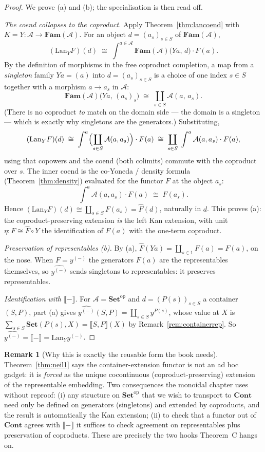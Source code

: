 \documentclass[11pt]{article}
\theoremstyle{plain}
\theoremstyle{definition}
\newtheorem{remark}[theorem]{Remark}
\newcommand{\Set}{\mathbf{Set}}
\newcommand{\Cont}{\mathbf{Cont}}
\newcommand{\Fam}{\mathbf{Fam}}
\newcommand{\op}{^{\mathrm{op}}}
\newcommand{\Lan}{\mathrm{Lan}}
\newcommand{\iso}{\cong}
\newcommand{\ext}[1]{\llbracket #1 \rrbracket}
\begin{document}
\begin{proof}
We prove (a) and (b); the specialisation is then read off.

\emph{The coend collapses to the coproduct.} Apply
Theorem~\ref{thm:lancoend} with $K=Y\colon\mathcal{A}\to\Fam(\mathcal{A})$. For an
object $d=(a_{s})_{s\in S}$ of $\Fam(\mathcal{A})$,
\[
  (\Lan_{Y}F)(d) \;\iso\; \int^{a\in\mathcal{A}} \Fam(\mathcal{A})\bigl(Y a,\,d\bigr)\cdot F(a).
\]
By the definition of morphisms in the free coproduct completion, a map from a
\emph{singleton} family $Y a=(a)$ into $d=(a_{s})_{s\in S}$ is a choice of one
index $s\in S$ together with a morphism $a\to a_{s}$ in $\mathcal{A}$:
\[
  \Fam(\mathcal{A})\bigl(Ya,\,(a_{s})_{s}\bigr) \;\iso\;
  \coprod_{s\in S} \mathcal{A}(a,\,a_{s}).
\]
(There is no coproduct \emph{to} match on the domain side --- the domain is a
singleton --- which is exactly why singletons are the generators.) Substituting,
\[
  (\Lan_{Y}F)(d)
   \;\iso\; \int^{a} \Bigl(\coprod_{s\in S}\mathcal{A}(a,a_{s})\Bigr)\cdot F(a)
   \;\iso\; \coprod_{s\in S}\;\int^{a} \mathcal{A}(a,a_{s})\cdot F(a),
\]
using that copowers and the coend (both colimits) commute with the coproduct over
$s$. The inner coend is the co-Yoneda / density formula
(Theorem~\ref{thm:density}) evaluated for the functor $F$ at the object $a_{s}$:
\[
  \int^{a}\mathcal{A}(a,a_{s})\cdot F(a)\;\iso\;F(a_{s}).
\]
Hence $(\Lan_{Y}F)(d)\iso\coprod_{s\in S}F(a_{s}) = \widehat{F}(d)$, naturally in
$d$. This proves (a): the coproduct-preserving extension \emph{is} the left Kan
extension, with unit $\eta\colon F\iso\widehat{F}\circ Y$ the identification of
$F(a)$ with the one-term coproduct.

\emph{Preservation of representables (b).} By (a),
$\widehat{F}(Ya)=\coprod_{s\in 1}F(a)=F(a)$, on the nose. When $F=y^{(-)}$ the
generators $F(a)$ are the representables themselves, so $\widehat{y^{(-)}}$ sends
singletons to representables: it preserves representables.

\emph{Identification with $\ext{-}$.} For $\mathcal{A}=\Set\op$ and
$d=(P(s))_{s\in S}$ a container $(S,P)$, part (a) gives
$\widehat{y^{(-)}}(S,P)=\coprod_{s\in S}y^{P(s)}$, whose value at $X$ is
$\sum_{s\in S}\Set(P(s),X)=\ext{S,P}(X)$ by Remark~\ref{rem:containerrep}. So
$\widehat{y^{(-)}}=\ext{-}=\Lan_{Y}y^{(-)}$. \end{proof}

\begin{remark}[Why this is exactly the reusable form the book needs]
\label{rem:reusable}
Theorem~\ref{thm:neil1} says the container-extension functor is not an ad hoc
gadget: it is \emph{forced} as the unique cocontinuous (coproduct-preserving)
extension of the representable embedding. Two consequences the monoidal chapter
uses without reproof: (i) any structure on $\Set\op$ that we wish to transport to
$\Cont$ need only be defined on generators (singletons) and extended by
coproducts, and the result is automatically the Kan extension; (ii) to check that
a functor out of $\Cont$ agrees with $\ext{-}$ it suffices to check agreement on
representables plus preservation of coproducts. These are precisely the two hooks
Theorem~C hangs on.
\end{remark}
\end{document}

